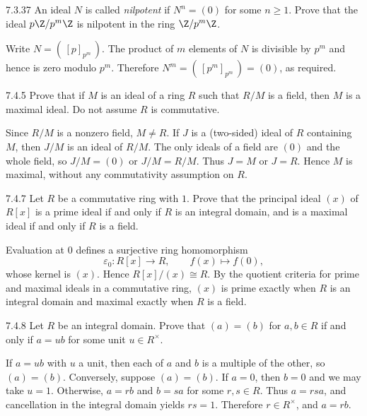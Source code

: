 \documentclass[11pt,oneside]{article}
\begin{document}
\begin{exercise}{7.3.37}
An ideal $N$ is called \emph{nilpotent} if $N^n=(0)$ for some $n\ge1$. Prove that the ideal $p\Z/p^m\Z$ is nilpotent in the ring $\Z/p^m\Z$.
\end{exercise}
\begin{solution}
Write $N=(\,[p]_{p^m}\,)$. The product of $m$ elements of $N$ is divisible by $p^m$ and hence is zero modulo $p^m$. Therefore $N^m=(\,[p^m]_{p^m}\,)=(0)$, as required.
\end{solution}

\begin{exercise}{7.4.5}
Prove that if $M$ is an ideal of a ring $R$ such that $R/M$ is a field, then $M$ is a maximal ideal. Do not assume $R$ is commutative.
\end{exercise}
\begin{solution}
Since $R/M$ is a nonzero field, $M\ne R$. If $J$ is a (two-sided) ideal of $R$ containing $M$, then $J/M$ is an ideal of $R/M$. The only ideals of a field are $(0)$ and the whole field, so $J/M=(0)$ or $J/M=R/M$. Thus $J=M$ or $J=R$. Hence $M$ is maximal, without any commutativity assumption on $R$.
\end{solution}

\begin{exercise}{7.4.7}
Let $R$ be a commutative ring with $1$. Prove that the principal ideal $(x)$ of $R[x]$ is a prime ideal if and only if $R$ is an integral domain, and is a maximal ideal if and only if $R$ is a field.
\end{exercise}
\begin{solution}
Evaluation at $0$ defines a surjective ring homomorphism
\[
\varepsilon_0:R[x]\to R,\qquad f(x)\mapsto f(0),
\]
whose kernel is $(x)$. Hence $R[x]/(x)\cong R$. By the quotient criteria for prime and maximal ideals in a commutative ring, $(x)$ is prime exactly when $R$ is an integral domain and maximal exactly when $R$ is a field.
\end{solution}

\begin{exercise}{7.4.8}
Let $R$ be an integral domain. Prove that $(a)=(b)$ for $a,b\in R$ if and only if $a=ub$ for some unit $u\in R^\times$.
\end{exercise}
\begin{solution}
If $a=ub$ with $u$ a unit, then each of $a$ and $b$ is a multiple of the other, so $(a)=(b)$. Conversely, suppose $(a)=(b)$. If $a=0$, then $b=0$ and we may take $u=1$. Otherwise, $a=rb$ and $b=sa$ for some $r,s\in R$. Thus $a=rsa$, and cancellation in the integral domain yields $rs=1$. Therefore $r\in R^\times$, and $a=rb$.
\end{solution}
\end{document}
